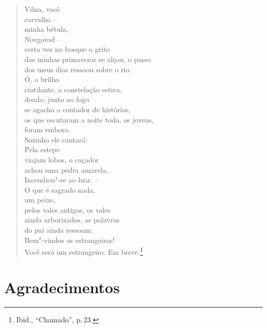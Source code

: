 \begin{verse}
Vilna, você\\
carvalho --\\
minha bétula,\\
Novgorod --\\
certa vez no bosque o grito\\
das minhas primaveras se alçou, o passo\\
dos meus dias ressoou sobre o rio.\\[10pt]
Ó, o brilho\\
cintilante, a constelação estiva,\\
doado; junto ao fogo\\
se agacha o contador de histórias,\\
os que escutaram a noite toda, os jovens,\\
foram embora.\\[10pt]
Sozinho ele cantará:\\
Pela estepe\\
viajam lobos, o caçador\\
achou uma pedra amarela,\\
Incendiou"-se ao luar. --\\[10pt]
O que é sagrado nada,\\
um peixe,\\
pelos vales antigos, os vales\\
ainda arborizados, as palavras\\
do pai ainda ressoam:\\
Bem"-vindos os estrangeiros!\\
Você será um estrangeiro. Em breve.\footnote{Ibid., ``Chamado'', p.\,23.}
\end{verse}

\chapter{Agradecimentos}

